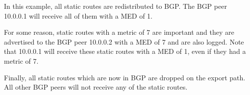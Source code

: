 In this example, all static routes are redistributed to BGP.  The BGP peer
10.0.0.1 will receive all of them with a MED of 1.  

For some reason, static routes with a metric of 7 are important and they are
advertised to the BGP peer 10.0.0.2 with a MED of 7 and are also logged.  Note
that 10.0.0.1 will receive these static routes with a MED of 1, even if they had
a metric of 7.

Finally, all static routes which are now in BGP are dropped on the export path.
All other BGP peers will not receive any of the static routes.
